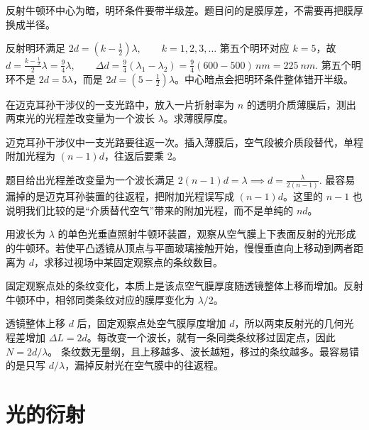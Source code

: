 \documentclass[lang=cn,11pt]{elegantbook}
\begin{document}
\begin{solution}
反射牛顿环中心为暗，明环条件要带半级差。题目问的是膜厚差，不需要再把膜厚换成半径。

反射明环满足
 \(2d=\left(k-\frac12\right)\lambda,\qquad k=1,2,3,\dots\) 
第五个明环对应 \(k=5\)，故
 \(d=\frac{k-\frac12}{2}\lambda =\frac{9}{4}\lambda,\qquad \Delta d=\frac94(\lambda_1-\lambda_2) =\frac94(600-500)\,\si{nm} =\SI{225}{nm}.\) 
第五个明环不是 \(2d=5\lambda\)，而是 \(2d=(5-\frac12)\lambda\)。中心暗点会把明环条件整体错开半级。
\end{solution}

\begin{exercise}
在迈克耳孙干涉仪的一支光路中，放入一片折射率为 \(n\) 的透明介质薄膜后，测出两束光的光程差改变量为一个波长 \(\lambda\)。求薄膜厚度。
\end{exercise}

\begin{solution}
迈克耳孙干涉仪中一支光路要往返一次。插入薄膜后，空气段被介质段替代，单程附加光程为 \((n-1)d\)，往返后要乘 \(2\)。

题目给出光程差改变量为一个波长满足
 \(2(n-1)d=\lambda \implies d=\frac{\lambda}{2(n-1)}.\) 
最容易漏掉的是迈克耳孙装置的往返程，把附加光程误写成 \((n-1)d\)。这里的 \(n-1\) 也说明我们比较的是“介质替代空气”带来的附加光程，而不是单纯的 \(nd\)。
\end{solution}

\begin{exercise}
用波长为 \(\lambda\) 的单色光垂直照射牛顿环装置，观察从空气膜上下表面反射的光形成的牛顿环。若使平凸透镜从顶点与平面玻璃接触开始，慢慢垂直向上移动到两者距离为 \(d\)，求移过视场中某固定观察点的条纹数目。
\end{exercise}

\begin{solution}
固定观察点处的条纹变化，本质上是该点空气膜厚度随透镜整体上移而增加。反射牛顿环中，相邻同类条纹对应的膜厚变化为 \(\lambda/2\)。

透镜整体上移 \(d\) 后，固定观察点处空气膜厚度增加 \(d\)，所以两束反射光的几何光程差增加 \(\Delta L=2d\)。每改变一个波长，就有一条同类条纹移过固定点，因此 \(N=2d/\lambda\)。
条纹数无量纲，且上移越多、波长越短，移过的条纹越多。最容易错的是只写 \(d/\lambda\)，漏掉反射光在空气膜中的往返程。
\end{solution}


\chapter{光的衍射}
\end{document}
